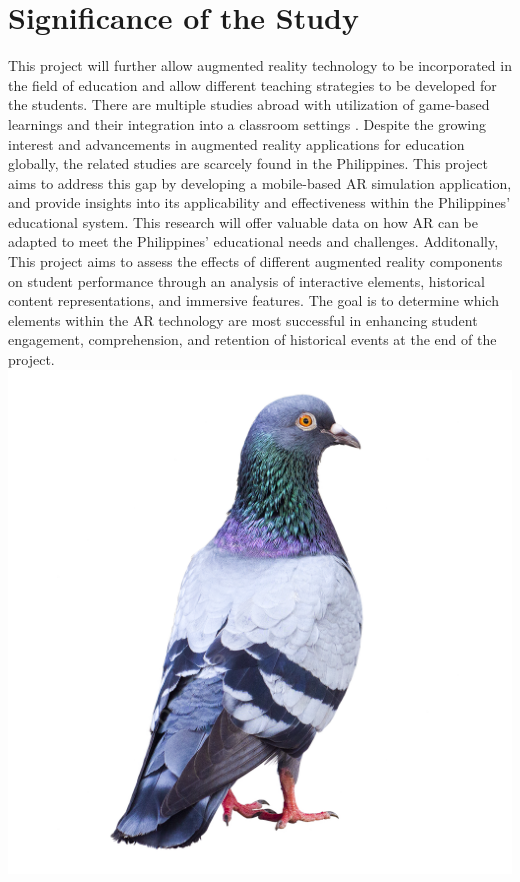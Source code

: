 \section{Significance of the Study}
This project will further allow augmented reality technology to be incorporated in the field of education and allow different teaching strategies to be developed for the students. There are multiple studies abroad with utilization of game-based learnings and their integration into a classroom settings \cite{watson2011}. Despite the growing interest and advancements in augmented reality applications for education globally, the related studies are scarcely found in the Philippines. This project aims to address this gap by developing a mobile-based AR simulation application, and provide insights into its applicability and effectiveness within the Philippines' educational system. This research will offer valuable data on how AR can be adapted to meet the Philippines' educational needs and challenges. Additonally, This project aims to assess the effects of different augmented reality components on student performance through an analysis of interactive elements, historical content representations, and immersive features. The goal is to determine which elements within the AR technology are most successful in enhancing student engagement,  comprehension, and retention of historical events at the end of the project.
\includegraphics{sample.png}


